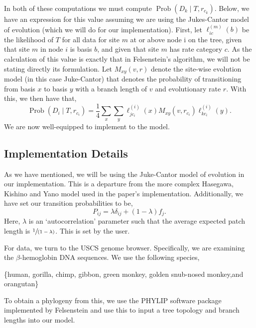 \documentclass[12pt]{article}
\newcommand{\prob}{\operatorname{Prob}}
\begin{document}
    In both of these computations we must compute $\prob(D_k \mid T, r_{c_k})$.
    Below, we have an expression for this value assuming we are using the Jukes-Cantor model of evolution (which we will do for our implementation).
    First, let $\ell_{ic}^{(m)}(b)$ be the likelihood of $T$ for all data for site $m$ at or above node i on the tree, given that site $m$ in node $i$ is basis $b$, and given that site $m$ has rate category $c$.
    As the calculation of this value is exactly that in Felsenstein's algorithm, we will not be stating directly its formulation.
    Let $M_{xy}(v, r)$ denote the site-wise evolution model (in this case Juke-Cantor) that denotes the probability of transitioning from basis $x$ to basis $y$ with a branch length of $v$ and evolutionary rate $r$.
    With this, we then have that,
    \[
        \prob(D_i \mid T, r_{c_i}) 
        = \frac{1}{4}\sum_x \sum_y \ell_{jc_i}^{(i)}(x) M_{xy}(v, r_{c_i}) \ell_{kc_i}^{(i)}(y).
    \]
    We are now well-equipped to implement to the model.

\subsection*{Implementation Details}
    As we have mentioned, we will be using the Juke-Cantor model of evolution in our implementation.
    This is a departure from the more complex Hasegawa, Kishino and Yano model used in the paper's implementation.
    Additionally, we have set our transition probabilities to be,
    \[
        P_{ij} = \lambda \delta_{ij} + (1 - \lambda)f_{j}.
    \]
    Here, $\lambda$ is an `autocorrelation' parameter such that the average expected patch length is $\sfrac{1}{(1 - \lambda)}$. 
    This is set by the user.

    For data, we turn to the USCS genome browser.
    Specifically, we are examining the $\beta$-hemoglobin DNA sequences.
    We use the following species,
    \begin{adjustwidth}{1in}{1in}
        \{human, gorilla, chimp, gibbon, green monkey, golden snub-nosed monkey,and orangutan\}
    \end{adjustwidth}
    To obtain a phylogeny from this, we use the PHYLIP software package implemented by Felsenstein and use this to input a tree topology and branch lengths into our model.
\end{document}
